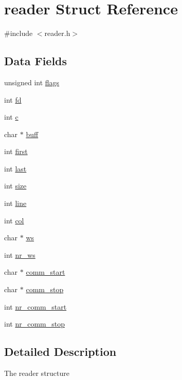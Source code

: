 \hypertarget{structreader}{\section{reader Struct Reference}
\label{structreader}
}


{\ttfamily \#include $<$reader.\-h$>$}

\subsection*{Data Fields}
\begin{DoxyCompactItemize}
\item 
unsigned int \hyperlink{structreader_ac92588540e8c1d014a08cd8a45462b19}{flags}
\item 
int \hyperlink{structreader_a6f8059414f0228f0256115e024eeed4b}{fd}
\item 
int \hyperlink{structreader_a4e1e0e72dd773439e333c84dd762a9c3}{c}
\item 
char $\ast$ \hyperlink{structreader_a13d46a89176726a5343cab02f94ebc9e}{buff}
\item 
int \hyperlink{structreader_a6c8ec3c3e77241328358d43697f6f840}{first}
\item 
int \hyperlink{structreader_a72e27dee31b1c4c6a504fbed29542d97}{last}
\item 
int \hyperlink{structreader_a439227feff9d7f55384e8780cfc2eb82}{size}
\item 
int \hyperlink{structreader_a41ebd28ef1d7c6ade45642cb6acc1039}{line}
\item 
int \hyperlink{structreader_afb52e720f5f0c483db5861f9e42e924e}{col}
\item 
char $\ast$ \hyperlink{structreader_a13ac982f10e04f30e71bee5775f0daf4}{ws}
\item 
int \hyperlink{structreader_a9cc374c220e8585d7e5470f1b48279a6}{nr\-\_\-ws}
\item 
char $\ast$ \hyperlink{structreader_a3fd4f881fc99ba16113b96ddc9f2fe1b}{comm\-\_\-start}
\item 
char $\ast$ \hyperlink{structreader_ab8cdabb86ef61bbce6789f770999cc75}{comm\-\_\-stop}
\item 
int \hyperlink{structreader_a822654e245dbd5290bc2de1f65e68c98}{nr\-\_\-comm\-\_\-start}
\item 
int \hyperlink{structreader_a8f344bd7a0d0c55eaf6dbf32e5e55258}{nr\-\_\-comm\-\_\-stop}
\end{DoxyCompactItemize}


\subsection{Detailed Description}
The reader structure 

